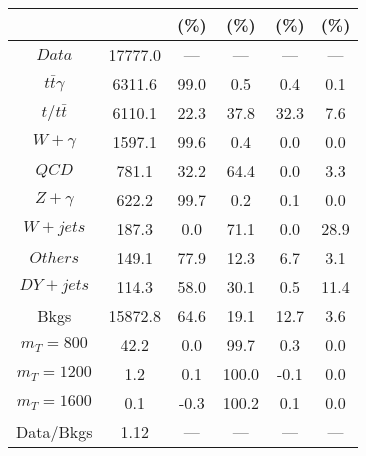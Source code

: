\begin{figure}
\begin{minipage}[c]{0.32\textwidth}
{\begin{tabular}{cccccc}
 &  & (\%) & (\%) & (\%) & (\%)  \\
\hline
                                                                      $ Data $ &  17777.0 &  --- &  --- &  --- &  ---\\
$ t\bar{t}\gamma $ &  6311.6 &  99.0 &  0.5 &  0.4 &  0.1\\
$ t/t\bar{t} $ &  6110.1 &  22.3 &  37.8 &  32.3 &  7.6\\
$ W+\gamma $ &  1597.1 &  99.6 &  0.4 &  0.0 &  0.0\\
$ QCD $ &  781.1 &  32.2 &  64.4 &  0.0 &  3.3\\
$ Z+\gamma $ &  622.2 &  99.7 &  0.2 &  0.1 &  0.0\\
$ W+jets $ &  187.3 &  0.0 &  71.1 &  0.0 &  28.9\\
$ Others $ &  149.1 &  77.9 &  12.3 &  6.7 &  3.1\\
$ DY+jets $ &  114.3 &  58.0 &  30.1 &  0.5 &  11.4\\
Bkgs &  15872.8 &  64.6 &  19.1 &  12.7 &  3.6\\
$ m_{T} = 800 $ &  42.2 &  0.0 &  99.7 &  0.3 &  0.0\\
$ m_{T} = 1200 $ &  1.2 &  0.1 &  100.0 &  -0.1 &  0.0\\
$ m_{T} = 1600 $ &  0.1 &  -0.3 &  100.2 &  0.1 &  0.0\\
Data/Bkgs &  1.12 &  --- &  --- &  --- &  ---\\
\hline
\end{tabular}
}
\end{minipage}
\end{figure}


